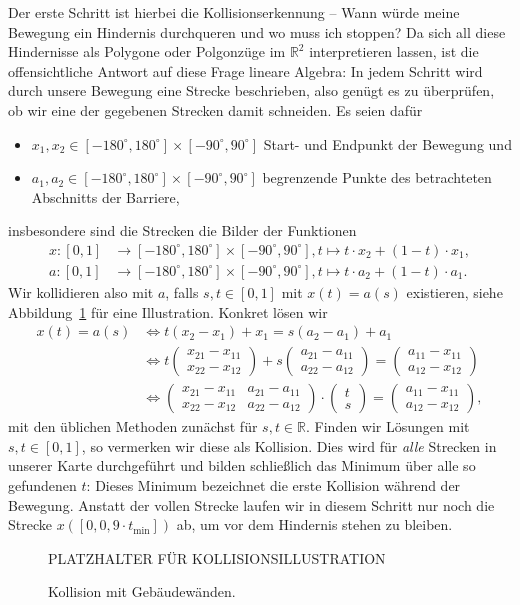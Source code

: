 \documentclass[
    paper=a4,
    DIV14,
    fontsize=12pt,
    pagesize=pdftex,
    toc=bibliographynumbered
]{scrartcl}
\numberwithin{figure}{section}
\numberwithin{equation}{section}
\numberwithin{table}{section}
\newcommand*\setR{\mathds{R}}
\newcommand*\vecz[2]{\begin{pmatrix} #1 \\ #2 \end{pmatrix}}
\newcommand*\matDD[4]{\begin{pmatrix} #1 & #2 \\ #3 & #4 \end{pmatrix}}
\begin{document}
Der erste Schritt ist hierbei die Kollisionserkennung -- Wann würde meine Bewegung ein
Hindernis durchqueren und wo muss ich stoppen? Da sich all diese Hindernisse als Polygone
oder Polgonzüge im $\setR^2$ interpretieren lassen, ist die offensichtliche Antwort auf
diese Frage lineare Algebra: In jedem Schritt wird durch unsere Bewegung eine Strecke
beschrieben, also genügt es zu überprüfen, ob wir eine der gegebenen Strecken damit
schneiden. Es seien dafür
\begin{itemize}
    \item $x_1, x_2 \in [-180^\circ, 180^\circ]\times[-90^\circ, 90^\circ]$ Start- und
        Endpunkt der Bewegung und
    \item $a_1, a_2 \in [-180^\circ, 180^\circ]\times[-90^\circ, 90^\circ]$ begrenzende
        Punkte des betrachteten Abschnitts der Barriere,
\end{itemize}
insbesondere sind die Strecken die Bilder der Funktionen
\begin{align*}
    x:[0,1] &\to [-180^\circ, 180^\circ]\times[-90^\circ, 90^\circ],
    t \mapsto t\cdot x_2 + (1-t) \cdot x_1, \\
    a:[0,1] &\to [-180^\circ, 180^\circ]\times[-90^\circ, 90^\circ],
    t \mapsto t \cdot a_2 + (1-t) \cdot a_1.
\end{align*}
Wir kollidieren also mit $a$, falls $s,t \in [0,1]$ mit $x(t) = a(s)$ existieren, siehe
Abbildung~\ref{fig:collision} für eine Illustration. Konkret lösen wir
\begin{align*}
    x(t) = a(s) &\iff
    t(x_2 - x_1) + x_1 = s(a_2 - a_1) + a_1 \\
    &\iff
    t\vecz{x_{21}-x_{11}}{x_{22}-x_{12}}+s\vecz{a_{21}-a_{11}}{a_{22}- a_{12}}
    =\vecz{a_{11}-x_{11}}{a_{12}-x_{12}} \\
    &\iff
    \matDD{x_{21}-x_{11}}{a_{21}-a_{11}}{x_{22}-x_{12}}{a_{22}- a_{12}} \cdot
    \vecz ts =\vecz{a_{11}-x_{11}}{a_{12}-x_{12}},
\end{align*}
mit den üblichen Methoden zunächst für $s,t\in\setR$. Finden wir Lösungen mit
$s,t\in[0,1]$, so vermerken wir diese als Kollision. Dies wird für \emph{alle} Strecken in
unserer Karte durchgeführt und bilden schließlich das Minimum über alle so gefundenen
$t$: Dieses Minimum bezeichnet die erste Kollision während der Bewegung. Anstatt der
vollen Strecke laufen wir in diesem Schritt nur noch die Strecke $x([0, 0{,}9\cdot
t_{\min}])$ ab, um vor dem Hindernis stehen zu bleiben.

\begin{figure}[htb]
    \centering
    PLATZHALTER FÜR KOLLISIONSILLUSTRATION
    \caption{Kollision mit Gebäudewänden.}
    \label{fig:collision}
\end{figure}
\end{document}

